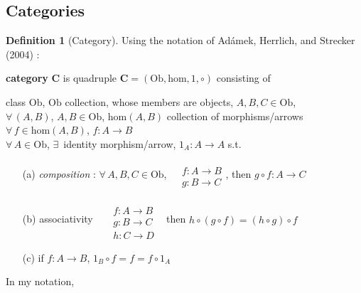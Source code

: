 \documentclass[twoside,landscape,10pt]{amsart}
\theoremstyle{plain}
\theoremstyle{definition}
\newtheorem{definition}{Definition}
\theoremstyle{remark}
\begin{document}
\begin{multicols*}{2}
\section{Categories}

\begin{definition}[Category] Using the notation of Ad\'{a}mek, Herrlich, and Strecker (2004) \cite{AHS2004}: 

  \textbf{category} $\mathbf{C}$ is quadruple $\mathbf{C} = (\text{Ob}, \text{hom},1,\circ)$ consisting of 

class $\text{Ob}$, $\text{Ob}$ collection, whose members are objects, $A,B,C \in \text{Ob}$, \\
$\forall \, (A,B)$, $A,B \in \text{Ob}$, $\text{hom}(A,B)$ collection of morphisms/arrows \\
$\forall \, f \in \text{hom}(A,B)$, $f:A\to B$ \\
$\forall \, A \in \text{Ob}$, $\exists \, $ identity morphism/arrow, $1_A : A \to A$ s.t.

\begin{enumerate}
  \item[(a)] \emph{composition} : $\forall \, A,B,C \in \text{Ob}$, $\begin{aligned} & \quad \\
    & f:A \to B \\
    & g:B \to C \end{aligned}$, then $g\circ f: A \to C$
  \item[(b)] associativity \quad \, $\begin{aligned}  & \quad \\
    & f:A \to B \\
    & g:B \to C \\
    & h:C \to D \end{aligned}$ \quad \, then $h\circ (g\circ f) = (h\circ g) \circ f$
\item[(c)] if $f:A \to B$, $1_B \circ f = f=  f\circ 1_A$
\end{enumerate}

In my notation,


\end{definition}
\end{multicols*}
\end{document}
